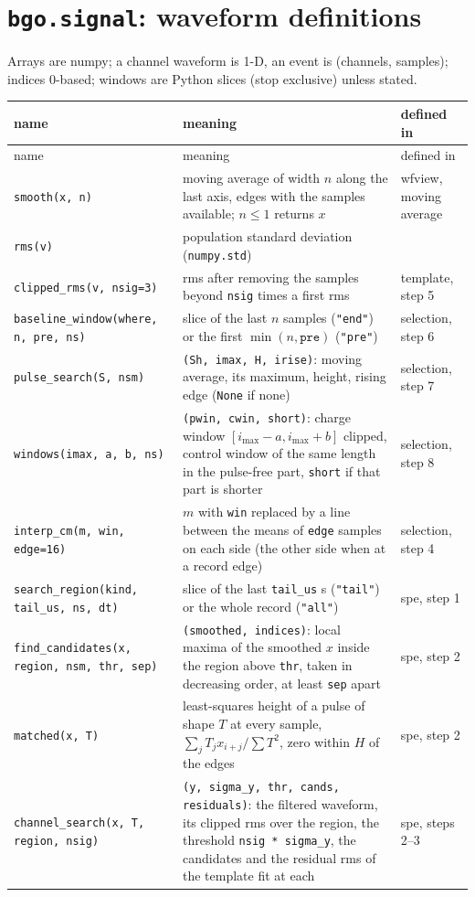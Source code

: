 \documentclass[11pt]{article}
\newcommand{\code}[1]{\texttt{#1}}
\newcommand{\us}{\textmu s}
\begin{document}
\section{\code{bgo.signal}: waveform definitions}

Arrays are numpy; a channel waveform is 1-D, an event is (channels,
samples); indices 0-based; windows are Python slices (stop exclusive)
unless stated.

\begin{longtable}{l p{70mm} l}
\toprule
name & meaning & defined in \\
\midrule
\endfirsthead
\toprule
name & meaning & defined in \\
\midrule
\endhead
\code{smooth(x, n)} & moving average of width $n$ along the last axis, edges with the samples available; $n \le 1$ returns $x$ & wfview, moving average \\
\code{rms(v)} & population standard deviation (\code{numpy.std}) & \\
\code{clipped\_rms(v, nsig=3)} & rms after removing the samples beyond \code{nsig} times a first rms & template, step 5 \\
\code{baseline\_window(where, n, pre, ns)} & slice of the last $n$ samples (\code{"end"}) or the first $\min(n, \code{pre})$ (\code{"pre"}) & selection, step 6 \\
\code{pulse\_search(S, nsm)} & \code{(Sh, imax, H, irise)}: moving average, its maximum, height, rising edge (\code{None} if none) & selection, step 7 \\
\code{windows(imax, a, b, ns)} & \code{(pwin, cwin, short)}: charge window $[i_{\max}-a, i_{\max}+b]$ clipped, control window of the same length in the pulse-free part, \code{short} if that part is shorter & selection, step 8 \\
\code{interp\_cm(m, win, edge=16)} & $m$ with \code{win} replaced by a line between the means of \code{edge} samples on each side (the other side when at a record edge) & selection, step 4 \\
\code{search\_region(kind, tail\_us, ns, dt)} & slice of the last \code{tail\_us} \us{} (\code{"tail"}) or the whole record (\code{"all"}) & spe, step 1 \\
\code{find\_candidates(x, region, nsm, thr, sep)} & \code{(smoothed, indices)}: local maxima of the smoothed $x$ inside the region above \code{thr}, taken in decreasing order, at least \code{sep} apart & spe, step 2 \\
\code{matched(x, T)} & least-squares height of a pulse of shape $T$ at every sample, $\sum_j T_j x_{i+j} / \sum T^2$, zero within $H$ of the edges & spe, step 2 \\
\code{channel\_search(x, T, region, nsig)} & \code{(y, sigma\_y, thr, cands, residuals)}: the filtered waveform, its clipped rms over the region, the threshold \code{nsig * sigma\_y}, the candidates and the residual rms of the template fit at each & spe, steps 2--3 \\
\bottomrule
\end{longtable}
\end{document}
